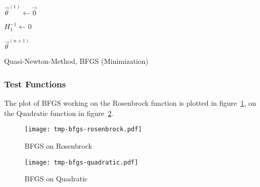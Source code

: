 			\begin{algorithm}
				\(\vec{\theta}^{(1)} \gets \vec{0}\)

				\(H_{1}^{-1} \gets 0\)


				\Return \(\vec{\theta}^{(n + 1)}\)

				\caption{Quasi-Newton-Method, BFGS (Minimization)}
				\label{alg:bfgs}
			\end{algorithm}

			\subsubsection{Test Functions}
				The plot of BFGS working on the Rosenbrock function is plotted in figure~\ref{fig:bfgsExampleRosenbrock}, on the Quadratic function in figure~\ref{fig:bfgsExampleQuadratic}.

				\begin{figure}
					\centering
					\texttt{[image: tmp-bfgs-rosenbrock.pdf]}
					\caption{BFGS on Rosenbrock}
					\label{fig:bfgsExampleRosenbrock}
				\end{figure}
				\begin{figure}
					\centering
					\texttt{[image: tmp-bfgs-quadratic.pdf]}
					\caption{BFGS on Quadratic}
					\label{fig:bfgsExampleQuadratic}
				\end{figure}

